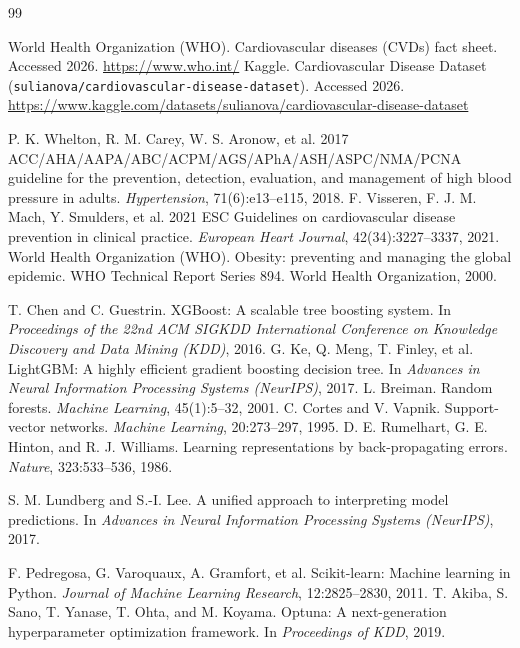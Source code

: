 \documentclass[12pt, a4paper, oneside]{book}
\begin{document}
\clearpage
{}
\renewcommand{\bibname}{References}
\begin{thebibliography}{99}
\setlength{\itemsep}{0.25em}
 World Health Organization (WHO). Cardiovascular diseases (CVDs) fact sheet. Accessed 2026. \url{https://www.who.int/}
 Kaggle. Cardiovascular Disease Dataset (\texttt{sulianova/cardiovascular-disease-dataset}). Accessed 2026. \url{https://www.kaggle.com/datasets/sulianova/cardiovascular-disease-dataset}

 P. K. Whelton, R. M. Carey, W. S. Aronow, et al. 2017 ACC/AHA/AAPA/ABC/ACPM/AGS/APhA/ASH/ASPC/NMA/PCNA guideline for the prevention, detection, evaluation, and management of high blood pressure in adults. \textit{Hypertension}, 71(6):e13--e115, 2018.
 F. Visseren, F. J. M. Mach, Y. Smulders, et al. 2021 ESC Guidelines on cardiovascular disease prevention in clinical practice. \textit{European Heart Journal}, 42(34):3227--3337, 2021.
 World Health Organization (WHO). Obesity: preventing and managing the global epidemic. WHO Technical Report Series 894. World Health Organization, 2000.

 T. Chen and C. Guestrin. XGBoost: A scalable tree boosting system. In \textit{Proceedings of the 22nd ACM SIGKDD International Conference on Knowledge Discovery and Data Mining (KDD)}, 2016.
 G. Ke, Q. Meng, T. Finley, et al. LightGBM: A highly efficient gradient boosting decision tree. In \textit{Advances in Neural Information Processing Systems (NeurIPS)}, 2017.
 L. Breiman. Random forests. \textit{Machine Learning}, 45(1):5--32, 2001.
 C. Cortes and V. Vapnik. Support-vector networks. \textit{Machine Learning}, 20:273--297, 1995.
 D. E. Rumelhart, G. E. Hinton, and R. J. Williams. Learning representations by back-propagating errors. \textit{Nature}, 323:533--536, 1986.

 S. M. Lundberg and S.-I. Lee. A unified approach to interpreting model predictions. In \textit{Advances in Neural Information Processing Systems (NeurIPS)}, 2017.

 F. Pedregosa, G. Varoquaux, A. Gramfort, et al. Scikit-learn: Machine learning in Python. \textit{Journal of Machine Learning Research}, 12:2825--2830, 2011.
 T. Akiba, S. Sano, T. Yanase, T. Ohta, and M. Koyama. Optuna: A next-generation hyperparameter optimization framework. In \textit{Proceedings of KDD}, 2019.


\end{thebibliography}
\end{document}
